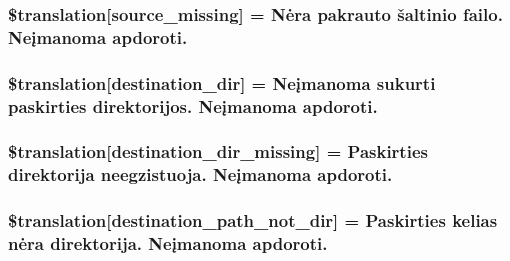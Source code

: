 \subsubsection[{\$translation}]{\setlength{\rightskip}{0pt plus 5cm}\$translation\mbox{[}\textquotesingle{}source\+\_\+missing\textquotesingle{}\mbox{]} = \textquotesingle{}Nėra pakrauto šaltinio failo. Neįmanoma apdoroti.\textquotesingle{}}\label{class_8upload_8lt___l_t_8php_aceaaf7355acaaf10f0ae60378d03c468}
\hypertarget{class_8upload_8lt___l_t_8php_aff2427c72a2598aefa6d58df1dd18b08}{}
\subsubsection[{\$translation}]{\setlength{\rightskip}{0pt plus 5cm}\$translation\mbox{[}\textquotesingle{}destination\+\_\+dir\textquotesingle{}\mbox{]} = \textquotesingle{}Neįmanoma sukurti paskirties direktorijos. Neįmanoma apdoroti.\textquotesingle{}}\label{class_8upload_8lt___l_t_8php_aff2427c72a2598aefa6d58df1dd18b08}
\hypertarget{class_8upload_8lt___l_t_8php_a9ef28d3cf09942c6c0a1e77fa09185e8}{}
\subsubsection[{\$translation}]{\setlength{\rightskip}{0pt plus 5cm}\$translation\mbox{[}\textquotesingle{}destination\+\_\+dir\+\_\+missing\textquotesingle{}\mbox{]} = \textquotesingle{}Paskirties direktorija neegzistuoja. Neįmanoma apdoroti.\textquotesingle{}}\label{class_8upload_8lt___l_t_8php_a9ef28d3cf09942c6c0a1e77fa09185e8}
\hypertarget{class_8upload_8lt___l_t_8php_a5704a67137126e8c87b7a364175929d4}{}
\subsubsection[{\$translation}]{\setlength{\rightskip}{0pt plus 5cm}\$translation\mbox{[}\textquotesingle{}destination\+\_\+path\+\_\+not\+\_\+dir\textquotesingle{}\mbox{]} = \textquotesingle{}Paskirties kelias nėra direktorija. Neįmanoma apdoroti.\textquotesingle{}}\label{class_8upload_8lt___l_t_8php_a5704a67137126e8c87b7a364175929d4}
\hypertarget{class_8upload_8lt___l_t_8php_a97608ea194a616db49141a0e6dee900c}{}
